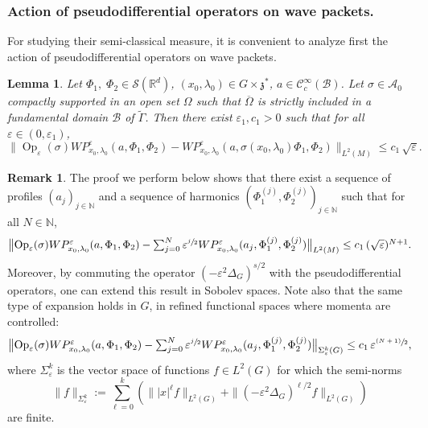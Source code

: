 \documentclass[10pt]{amsart}
\let\mathcal\mathscr
\newcommand{\psfrac}[2]{\sfrac{(#1)}{#2}}
\DeclareMathOperator{\Op}{Op}
\theoremstyle{plain}
\newtheorem{lemma}[theorem]{Lemma}
\theoremstyle{definition}
\newtheorem{remark}[theorem]{Remark}
\let\eps\varepsilon
\def\R{{\mathbb R}}
\def\N{{\mathbb N}}
\begin{document}
\subsubsection{Action of pseudodifferential operators on wave packets. }

For studying their semi-classical measure, it is convenient to analyze first the action of pseudodifferential operators on wave packets.

\begin{lemma}\label{lem:pseudo}
Let $\Phi_1,\;\Phi_2\in\mathcal S(\R^d)$, $(x_0,\lambda_0)\in G\times \mathfrak z^*$, $a\in{\mathcal C}^\infty_c(\mathcal B)$. Let $\sigma\in{{\mathcal A}_0}$ compactly supported in an open set $\Omega$ such that $\overline \Omega$ is strictly included in a fundamental domain $\mathcal B$ of $\widetilde \Gamma$. Then there exist $\eps_1, c_1>0$ such that for all $\eps\in(0,\eps_1)$,
\[
\bigl\| \Op_\eps(\sigma) WP^\eps_{x_0,\lambda_0}(a,\Phi_1,\Phi_2)- WP^\eps_{x_0,\lambda_0}(a,\sigma(x_0,\lambda_0)\Phi_1,\Phi_2) \bigr\|_{L^2(M)} \leq c_1\, \sqrt\eps.
\]
\end{lemma}

\begin{remark} \label{rem:asympexpansion}
The proof we perform below shows that there exist a sequence of profiles $(a_j)_{j\in\N}$ and a sequence of harmonics $(\Phi_1^{(j)}, \Phi_2^{(j)})_{j\in\N}$ such that for all $N\in\N$,
\[\textstyle
\bigl\| \Op_\eps(\sigma) WP^\eps_{x_0,\lambda_0}(a,\Phi_1,\Phi_2)- \sum_{j=0}^N \eps^{\sfrac j 2} WP^\eps_{x_0,\lambda_0}(a_j,\Phi_1^{(j)},\Phi_2^{(j)}) \bigr\|_{L^2(M)} \leq c_1\, (\sqrt\eps)^{N+1}.
\]
Moreover, by commuting the operator $(-\eps^2 \Delta_G)^{s/2}$ with the pseudodifferential operators, one can extend this result in Sobolev spaces.
Note also that the same type of expansion holds in $G$, in refined functional spaces where momenta are controlled:
\[\textstyle
\bigl\| \Op_\eps(\sigma) WP^\eps_{x_0,\lambda_0}(a,\Phi_1,\Phi_2)- \sum_{j=0}^N \eps^{\sfrac j 2} WP^\eps_{x_0,\lambda_0}(a_j,\Phi_1^{(j)},\Phi_2^{(j)}) \bigr\|_{\Sigma^k_\eps(G)} \leq c_1\, \eps^{\psfrac{N+1}{2}},
\]
where $\Sigma^k_\eps$ is the vector space of functions $f\in L^2(G)$ for which the semi-norms
\begin{equation} \label{e:Sigmakeps}
\| f\|_{\Sigma^k_\eps} := \sum_{\ell=0}^k\left(\| |x|^\ell f\|_{L^2(G)} + \| (-\eps^2 \Delta_G)^{\ell/2} f\|_{L^2(G)}\right)
\end{equation}
are finite.
\end{remark}
\end{document}
